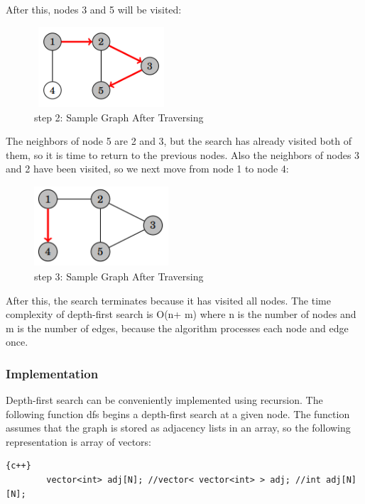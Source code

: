 \newpage

After this, nodes 3 and 5 will be visited:

\begin{figure}[h]
    \centering
\includegraphics[width=5cm, height=3cm]{graph-example-traverse-2.png}
 \caption{step 2: Sample Graph After Traversing}
    \label{fig:graph-example-traverse-2}
\end{figure}

The neighbors of node 5 are 2 and 3, but the search has already visited both of them, so it is time to return to the previous nodes. Also the neighbors of nodes 3 and 2 have been visited, so we next move from node 1 to node 4:

\begin{figure}[h]
    \centering
\includegraphics[width=5cm, height=3cm]{graph-example-traverse-3.png}
 \caption{step 3: Sample Graph After Traversing}
    \label{fig:graph-example-traverse-3}
\end{figure}

After this, the search terminates because it has visited all nodes.
The time complexity of depth-first search is O(n+ m) where n is the number of nodes and m is the number of edges, because the algorithm processes each node and edge once.
\newpage

\subsubsection{Implementation}

Depth-first search can be conveniently implemented using recursion. The following function dfs begins a depth-first search at a given node. The function assumes that the graph is stored as adjacency lists in an array, so the following representation is array of vectors: 
\begin{lstlisting}{c++}
        vector<int> adj[N]; //vector< vector<int> > adj; //int adj[N][N];
\end{lstlisting}

